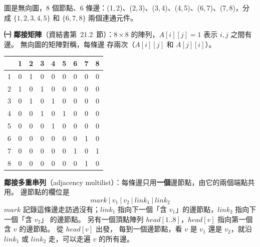\begin{pastsoln}
圖是無向圖，$8$ 個節點、$6$ 條邊：(1,\,2)、(2,\,3)、(3,\,4)、(4,\,5)、(6,\,7)、(7,\,8)，分成 $\{1,2,3,4,5\}$ 和 $\{6,7,8\}$ 兩個連通元件。

\textbf{㈠ 鄰接矩陣}（資結書第~21.2~節）：$8 \times 8$ 的陣列，$A[i][j] = 1$ 表示 $i, j$ 之間有邊。 無向圖的矩陣對稱，每條邊
存兩次（$A[i][j]$ 和 $A[j][i]$）。
\begin{center}
\small
\begin{tabular}{c|cccccccc}
 & 1 & 2 & 3 & 4 & 5 & 6 & 7 & 8 \\
\hline
1 & 0 & 1 & 0 & 0 & 0 & 0 & 0 & 0 \\
2 & 1 & 0 & 1 & 0 & 0 & 0 & 0 & 0 \\
3 & 0 & 1 & 0 & 1 & 0 & 0 & 0 & 0 \\
4 & 0 & 0 & 1 & 0 & 1 & 0 & 0 & 0 \\
5 & 0 & 0 & 0 & 1 & 0 & 0 & 0 & 0 \\
6 & 0 & 0 & 0 & 0 & 0 & 0 & 1 & 0 \\
7 & 0 & 0 & 0 & 0 & 0 & 1 & 0 & 1 \\
8 & 0 & 0 & 0 & 0 & 0 & 0 & 1 & 0 \\
\end{tabular}
\end{center}

\textbf{鄰接多重串列}（adjacency multilist）：每條邊只用\textbf{一個}邊節點，由它的兩個端點共用。 邊節點的欄位是
\[
\boxed{\ \mathit{mark}\ \big|\ v_1\ \big|\ v_2\ \big|\ \mathit{link}_1\ \big|\ \mathit{link}_2\ }
\]
$\mathit{mark}$ 記錄這條邊走訪過沒有；$\mathit{link}_1$ 指向下一個「含 $v_1$」的邊節點，$\mathit{link}_2$ 指向下一個「含 $v_2$」
的邊節點。 另有一個頂點陣列 $\mathit{head}[1..8]$，$\mathit{head}[v]$ 指向第一個含 $v$ 的邊節點。 從 $\mathit{head}[v]$ 出發，
每到一個邊節點，看 $v$ 是 $v_1$ 還是 $v_2$，就沿 $\mathit{link}_1$ 或 $\mathit{link}_2$ 走，可以走遍 $v$ 的所有邊。


\end{pastsoln}
